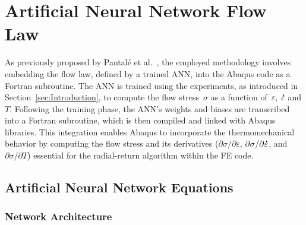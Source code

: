 \documentclass[algorithms,article,accept,pdftex,oneauthor]{Definitions/mdpi}
\DeclareRobustCommand{\mdot}[1]{\accentset{\mbox{\bfseries .}}{#1}}
\begin{document}
\section{Artificial Neural Network Flow Law}\label{sec:ANN}

As previously proposed by Pantalé et al.~\cite{Pantale-2021-EIN, Pantale-2023-DIA}, the employed methodology involves embedding the flow law, defined by a trained ANN, into the Abaqus code as a Fortran subroutine.
The ANN is trained using the experiments, as introduced in Section~\ref{sec:Introduction}, to compute the flow stress~$\sigma$ as a function of~$\varepsilon$, $\mdot{\varepsilon}$ and $T$.
Following the training phase, the ANN's weights and biases are transcribed into a Fortran subroutine, which is then compiled and linked with Abaqus libraries.
This integration enables Abaqus to incorporate the thermomechanical behavior by computing the flow stress and its derivatives ($\partial\sigma/\partial\varepsilon$, $\partial\sigma/\partial\mdot{\varepsilon}$, and $\partial\sigma/\partial T$) essential for the radial-return algorithm within the FE code.

\subsection{Artificial Neural Network Equations}\label{subsec:ANN-eqn}

\subsubsection{Network Architecture}\label{subsubsec:ANN-arch}
\end{document}
